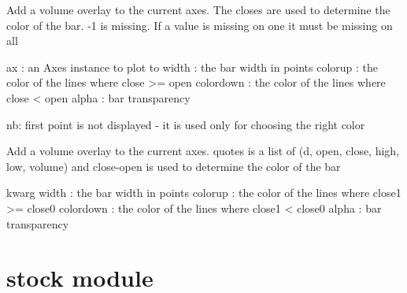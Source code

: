 \documentclass[letterpaper,10pt,english]{sphinxmanual}
\begin{document}
\begin{fulllineitems}
\label{newfinance:newfinance.volume_overlay2}
Add a volume overlay to the current axes.  The closes are used to
determine the color of the bar.  -1 is missing.  If a value is
missing on one it must be missing on all

ax          : an Axes instance to plot to
width       : the bar width in points
colorup     : the color of the lines where close \textgreater{}= open
colordown   : the color of the lines where close \textless{}  open
alpha       : bar transparency

nb: first point is not displayed - it is used only for choosing the
right color

\end{fulllineitems}


\begin{fulllineitems}
\label{newfinance:newfinance.volume_overlay3}
Add a volume overlay to the current axes.  quotes is a list of (d,
open, close, high, low, volume) and close-open is used to
determine the color of the bar

kwarg
width       : the bar width in points
colorup     : the color of the lines where close1 \textgreater{}= close0
colordown   : the color of the lines where close1 \textless{}  close0
alpha       : bar transparency

\end{fulllineitems}



\chapter{stock module}
\label{stock::doc}\label{stock:module-stock}\label{stock:stock-module}
\end{document}
